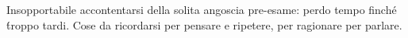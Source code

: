 Insopportabile accontentarsi della solita angoscia pre-esame: perdo tempo finch\'e \' troppo tardi. Cose da ricordarsi per pensare e ripetere, per ragionare per parlare.